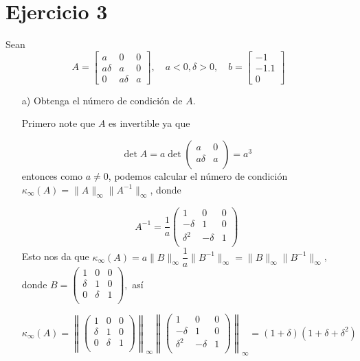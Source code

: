 
\section*{Ejercicio 3}
Sean
\[
A = \begin{bmatrix} a & 0 & 0 \\ a\delta & a & 0 \\ 0 & a\delta & a \end{bmatrix}, \quad a < 0, \delta > 0, \quad b = \begin{bmatrix} -1 \\ -1.1 \\ 0 \end{bmatrix}
\]
\begin{enumerate}
    \item[a)] Obtenga el número de condición de $A$.

    \begin{solution}
        Primero note que $A$ es invertible ya que

        $$\det A=a\det \begin{pmatrix}
            a & 0 \\
            a\delta & a \\
        \end{pmatrix}=a^3$$
    entonces como $a\neq 0$, podemos calcular el número de condición $\kappa_{\infty}(A)=\|A\|_{\infty}\|A^{-1}\|_{\infty}$, donde

    $$A^{-1}=\dfrac{1}{a}\left(
\begin{array}{ccc}
 1 & 0 & 0 \\
 -\delta & 1 & 0 \\
 \delta^2 & -\delta & 1 \\
\end{array}
\right)$$
Esto nos da que $\kappa_{\infty}(A)=a\|B\|_{\infty}\dfrac{1}{a}\|B^{-1}\|_{\infty}=\|B\|_{\infty}\|B^{-1}\|_{\infty}$, donde $B=\left(
\begin{array}{ccc}
 1 & 0 & 0 \\
 \delta  & 1 & 0 \\
 0 & \delta  & 1 \\
\end{array}
\right),$ así

$$\kappa_{\infty}(A)=\left\|\left(
\begin{array}{ccc}
 1 & 0 & 0 \\
 \delta  & 1 & 0 \\
 0 & \delta  & 1 \\
\end{array}
\right)\right\|_{\infty}\left\|\left(\begin{array}{ccc}
 1 & 0 & 0 \\
 -\delta & 1 & 0 \\
 \delta^2 & -\delta & 1 \\
\end{array}\right)\right\|_{\infty}=(1+\delta)(1+\delta+\delta^2)$$




\end{solution}
\end{enumerate}
